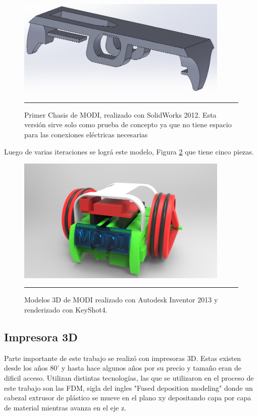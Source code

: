 \begin{figure}[htbp]
	\centering
		\includegraphics[width=0.9\textwidth]{./Figures/MODI/1MODI.jpg}
		\rule{35em}{0.5pt}
	\caption[ModiSolidWorks]{Primer Chasis de MODI, realizado con SolidWorks 2012. Esta versión sirve solo como prueba de concepto ya que no tiene espacio para las conexiones eléctricas necesarias}
	\label{fig:MODISolidWork}
\end{figure}	

Luego de varias iteraciones se lográ este modelo, Figura \ref{fig:render3} que tiene cinco piezas. 


\begin{figure}[htbp]
	\centering
		\includegraphics[width=0.9\textwidth]{./Figures/MODI/render3.jpg}
		\rule{35em}{0.5pt}
	\caption[Render]{Modelos 3D de MODI realizado con Autodesk Inventor 2013 y renderizado con KeyShot4. }
	\label{fig:render3}
\end{figure}	


\subsection{Impresora 3D}

Parte importante de este trabajo se realizó con impresoras 3D. Estas existen desde los años 80' y hasta hace algunos años por su precio y tamaño eran de dificil acceso. Utilizan distintas tecnologías, las que se utilizaron en el proceso de este trabajo son las FDM, sigla del ingles "Fused deposition modeling" donde un cabezal extrusor de plástico se mueve en el plano xy depositando capa por capa de material mientras avanza en el eje z.

